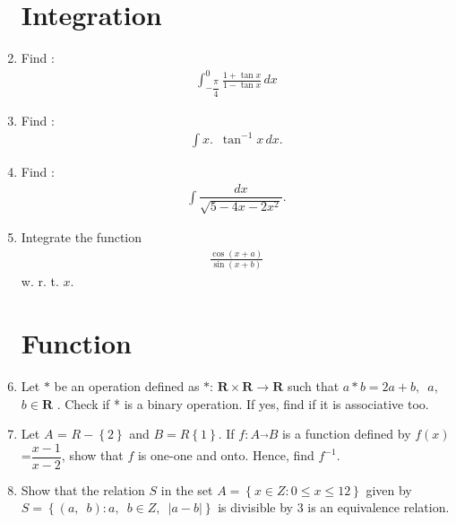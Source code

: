 \documentclass[12pt,-letter paper]{article}
\providecommand{\cbrak}[1]{\ensuremath{\left\{#1\right\}}}
\providecommand{\brak}[1]{\ensuremath{\left(#1\right)}}
\providecommand{\abs}[1]{\left\vert#1\right\vert}
\begin{document}
\begin{enumerate}
\section{Integration}
     \item Find :
        \begin{align*}
         \int_{-\dfrac{\pi}{4}}^{0}  \frac{1+\tan{x}}{1- \tan{x}} \,dx
        \end{align*}

     \item Find :
        \begin{align*}
            \int x.\hspace{6pt}\tan^{-1}{x} \,dx.
        \end{align*}

    \item Find :
        \begin{align*}
            \int \dfrac{dx}{\sqrt{5-4x-2x^2}}.
        \end{align*}

    \item Integrate the function
    \begin{align*}
    \frac{\cos{\brak{x+a}}}{\sin{\brak{x+b}}}
    \end{align*}
    w. r. t. $x$.
        
\section{Function}
    \item Let $*$ be an operation defined as $*$: $\textbf{R}\times\textbf{R}\rightarrow \textbf{R} $ such that $a * b = 2a + b,\hspace{6pt}a$, $b\in \textbf{R} $ . Check if * is a binary operation. If yes, find if it is associative too.

    \item Let $A$ = $R-\cbrak{2}$ and $B=R\cbrak{1}$. If $f: A\overrightarrow{}  B$ is a function defined by $f\brak{x}$=$\dfrac{x-1}{x-2}$, show that $f$ is one-one and onto. Hence, find $f^{-1}$.

    \item Show that the relation $S$ in the set $A = \cbrak{x \in Z : 0 \leq x \leq 12}$ given by $S = \cbrak{(a,\hspace{6pt}b) : a,\hspace{6pt}b \in Z,\hspace{6pt}\abs{a-b}}$ is divisible by $3$ is an equivalence relation.


\end{enumerate}
\end{document}
